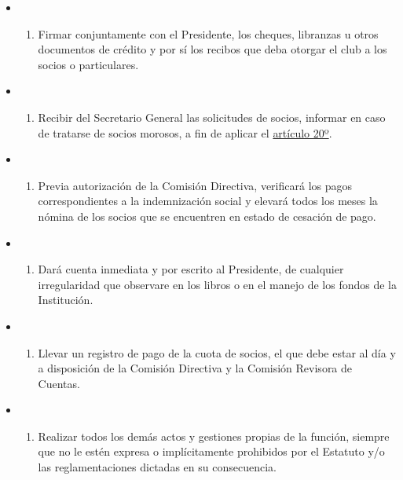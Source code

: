 \documentclass[]{book}
\providecommand{\tightlist}{%
  \setlength{\itemsep}{0pt}\setlength{\parskip}{0pt}}
\begin{document}
\begin{itemize}
\begin{itemize}
\begin{enumerate}
    \end{enumerate}
  \item
    \begin{enumerate}
    \def\labelenumi{\alph{enumi})}
    \setcounter{enumi}{5}
    \tightlist
    \item
      Firmar conjuntamente con el Presidente, los cheques, libranzas u otros documentos de crédito y por sí los recibos que deba otorgar el club a los socios o particulares.
    \end{enumerate}
  \item
    \begin{enumerate}
    \def\labelenumi{\alph{enumi})}
    \setcounter{enumi}{6}
    \tightlist
    \item
      Recibir del Secretario General las solicitudes de socios, informar en caso de tratarse de socios morosos, a fin de aplicar el \protect\hyperlink{art20}{artículo 20º}.
    \end{enumerate}
  \item
    \begin{enumerate}
    \def\labelenumi{\alph{enumi})}
    \setcounter{enumi}{7}
    \tightlist
    \item
      Previa autorización de la Comisión Directiva, verificará los pagos correspondientes a la indemnización social y elevará todos los meses la nómina de los socios que se encuentren en estado de cesación de pago.
    \end{enumerate}
  \item
    \begin{enumerate}
    \def\labelenumi{\roman{enumi})}
    \tightlist
    \item
      Dará cuenta inmediata y por escrito al Presidente, de cualquier irregularidad que observare en los libros o en el manejo de los fondos de la Institución.
    \end{enumerate}
  \item
    \begin{enumerate}
    \def\labelenumi{\alph{enumi})}
    \setcounter{enumi}{9}
    \tightlist
    \item
      Llevar un registro de pago de la cuota de socios, el que debe estar al día y a disposición de la Comisión Directiva y la Comisión Revisora de Cuentas.
    \end{enumerate}
  \item
    \begin{enumerate}
    \def\labelenumi{\alph{enumi})}
    \setcounter{enumi}{10}
    \tightlist
    \item
      Realizar todos los demás actos y gestiones propias de la función, siempre que no le estén expresa o implícitamente prohibidos por el Estatuto y/o las reglamentaciones dictadas en su consecuencia.
    \end{enumerate}
  \end{itemize}
\end{itemize}
\end{document}
